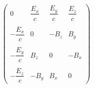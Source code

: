 \documentclass[preview]{standalone}
\begin{document}
\begin{align*}
\begin{pmatrix} 0 & \dfrac{E_{x}}{c} & \dfrac{E_{y}}{c} & \dfrac{E_{z}}{c} \\ \
                          &&& \\ -\dfrac{E_{x}}{c} & 0 & - B_{z} & B_{y} \\ \
                          &&& \\ -\dfrac{E_{y}}{c} &  B_{z} & 0 & - B_{x} \\ &&& \\ -\dfrac{E_{z}}{c} &  -B_{y} & B_{x} & 0 \end{pmatrix}
\end{align*}
\end{document}
